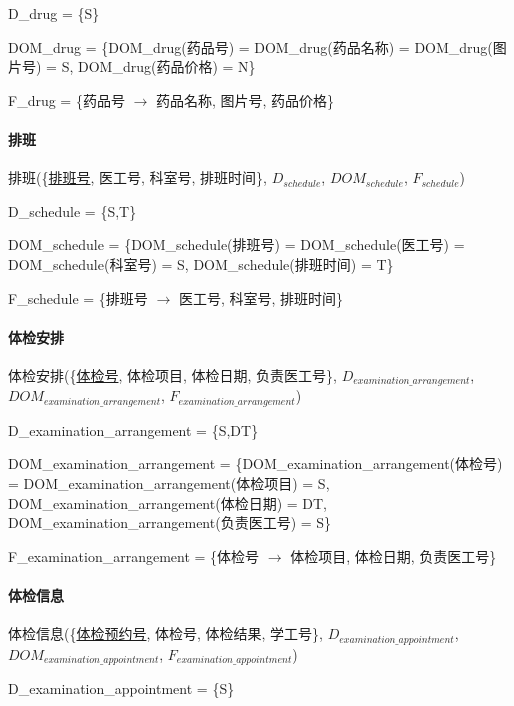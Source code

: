 \documentclass{article}
\begin{document}
D\_drug = \{S\}

DOM\_drug = \{DOM\_drug(药品号) = DOM\_drug(药品名称) = DOM\_drug(图片号) = S, \newline DOM\_drug(药品价格) = N\}

F\_drug = \{药品号 $\rightarrow$ 药品名称, 图片号, 药品价格\}

\paragraph{排班}

排班(\{\underline{排班号}, 医工号, 科室号, 排班时间\}, $D_{schedule}$, $DOM_{schedule}$, $F_{schedule}$)

D\_schedule = \{S,T\}

DOM\_schedule = \{DOM\_schedule(排班号) = DOM\_schedule(医工号) = DOM\_schedule(科室号) = S, DOM\_schedule(排班时间) = T\}

F\_schedule = \{排班号 $\rightarrow$ 医工号, 科室号, 排班时间\}

\paragraph{体检安排}

体检安排(\{\underline{体检号}, 体检项目, 体检日期, 负责医工号\}, $D_{examination\_arrangement}$, \newline$DOM_{examination\_arrangement}$, $F_{examination\_arrangement}$)

D\_examination\_arrangement = \{S,DT\}

DOM\_examination\_arrangement = \{DOM\_examination\_arrangement(体检号) = \newline DOM\_examination\_arrangement(体检项目) = S, \newline DOM\_examination\_arrangement(体检日期) = DT, DOM\_examination\_arrangement(负责医工号) = S\}

F\_examination\_arrangement = \{体检号 $\rightarrow$ 体检项目, 体检日期, 负责医工号\}

\paragraph{体检信息}

体检信息(\{\underline{体检预约号}, 体检号, 体检结果, 学工号\}, $D_{examination\_appointment}$, \newline $DOM_{examination\_appointment}$, $F_{examination\_appointment}$)

D\_examination\_appointment = \{S\}
\end{document}
